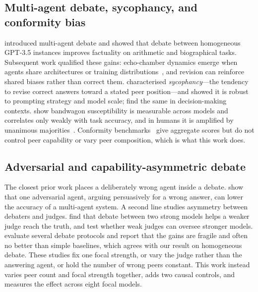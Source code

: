 \documentclass[11pt]{article}
\begin{document}
\subsection{Multi-agent debate, sycophancy, and conformity bias}
\label{sub:mad}

\citet{du2023improving} introduced multi-agent debate and showed that
debate between homogeneous GPT-3.5 instances improves factuality on
arithmetic and biographical tasks.
Subsequent work qualified these gains: echo-chamber dynamics emerge
when agents share architectures or training
distributions~\citep{hong2025sycon}, and revision can reinforce shared
biases rather than correct them.
\citet{sharma2023towards} characterised \emph{sycophancy}---the
tendency to revise correct answers toward a stated peer position---and showed
it is robust to prompting strategy and model scale;
\citet{echterhoff2024cognitive} find the same in decision-making contexts.
\citet{koo2024benchmarking} show bandwagon susceptibility is measurable across
models and correlates only weakly with task accuracy, and in humans it is
amplified by unanimous majorities~\citep{asch1951effects,bond1996culture}.
Conformity benchmarks~\citep{weng2025benchform,hong2025sycon} give aggregate
scores but do not control peer capability or vary peer composition, which is
what this work does.

\subsection{Adversarial and capability-asymmetric debate}
\label{sub:adversarial}

The closest prior work places a deliberately wrong agent inside a debate.
\citet{amayuelas2024multiagent} show that one adversarial agent, arguing
persuasively for a wrong answer, can lower the accuracy of a multi-agent
system.
A second line studies asymmetry between debaters and judges.
\citet{khan2024debating} find that debate between two strong models helps a
weaker judge reach the truth, and \citet{kenton2024scalable} test whether
weak judges can oversee stronger models.
\citet{smit2024going} evaluate several debate protocols and report that the
gains are fragile and often no better than simple baselines, which agrees
with our result on homogeneous debate.
These studies fix one focal strength, or vary the judge rather than the
answering agent, or hold the number of wrong peers constant.
This work instead varies peer count and focal strength together, adds two
causal controls, and measures the effect across eight focal models.
\end{document}
